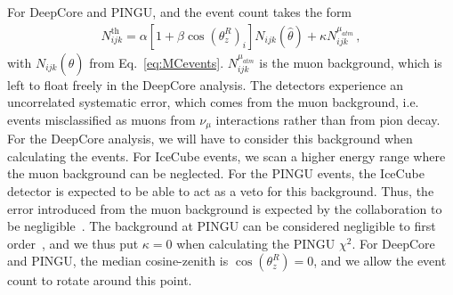 \documentclass{article}
\newcommand{\zreco}{\ensuremath{\cos{(\theta_z^{R})}}}
\newcommand{\nm}{\nu_\mu}
\begin{document}
For DeepCore and PINGU, and the event count takes the form
\begin{align}
    N^\text{th}_{ijk} = \alpha\left[1+\beta \zreco_i \right] N_{ijk}(\hat{\theta}) + \kappa N_{ijk}^{\mu_{atm}}\,,
\end{align}
with $N_{ijk}(\hat{\theta})$ from Eq.~\ref{eq:MCevents}. $N_{ijk}^{\mu_{atm}}$ is the muon background, which is left to float freely in the DeepCore analysis.
The detectors experience an uncorrelated systematic error, which comes from the muon background, 
i.e. events misclassified as muons from 
$\nm$ interactions rather than from pion decay. For the DeepCore analysis, we will have to consider this background when calculating the events.
For IceCube events, we scan a higher energy range where the muon background can be neglected. For the PINGU events, the IceCube detector is 
expected to be able to act as a veto for this background. Thus, the error introduced from the muon background is expected by the collaboration 
to be negligible~\cite{PINGUletter}.
The background at PINGU can be considered negligible to first order~\cite{PINGUdata}, and we thus put $\kappa=0$ when calculating the PINGU $\chi^2$.
For DeepCore and PINGU, the median cosine-zenith is $\zreco = 0$, and we allow the event count to rotate around this point.
\end{document}
